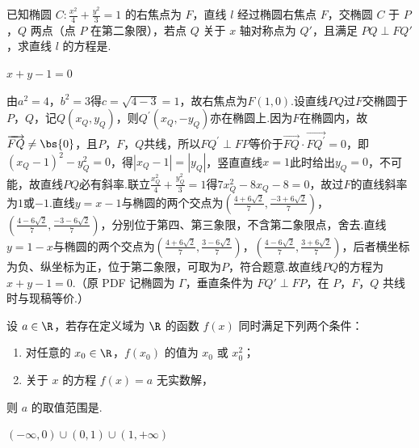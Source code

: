\begin{problem}
已知椭圆 \(C:\frac{x^2}{4}+\frac{y^2}{3}=1\) 的右焦点为 \(F\)，直线 \(l\) 经过椭圆右焦点 \(F\)，交椭圆 \(C\) 于 \(P\)，\(Q\) 两点（点 \(P\) 在第二象限），若点 \(Q\) 关于 \(x\) 轴对称点为 \(Q'\)，且满足 \(PQ\perp FQ'\)，求直线 \(l\) 的方程是\fillinblank{}.

\end{problem}

\begin{answer}
\(x+y-1=0\)
\end{answer}

\begin{solution}
由\(a^2=4\)，\(b^2=3\)得\(c=\sqrt{4-3}=1\)，故右焦点为\(F(1,0)\).设直线\(PQ\)过\(F\)交椭圆于\(P\)，\(Q\)，记\(Q(x_Q,y_Q)\)，则\(Q^\prime(x_Q,-y_Q)\)亦在椭圆上.因为\(F\)在椭圆内，故\(\overrightarrow{FQ}\ne\bs{0}\)，且\(P\)，\(F\)，\(Q\)共线，所以\(FQ^\prime\perp FP\)等价于\(\overrightarrow{FQ}\cdot\overrightarrow{FQ^\prime}=0\)，即\((x_Q-1)^2-y_Q^2=0\)，得\(|x_Q-1|=|y_Q|\)，竖直直线\(x=1\)此时给出\(y_Q=0\)，不可能，故直线\(PQ\)必有斜率.联立\(\frac{x_Q^2}{4}+\frac{y_Q^2}{3}=1\)得\(7x_Q^2-8x_Q-8=0\)，故过\(F\)的直线斜率为\(1\)或\(-1\).直线\(y=x-1\)与椭圆的两个交点为\(\left(\frac{4+6\sqrt2}{7},\frac{-3+6\sqrt2}{7}\right)\)，\(\left(\frac{4-6\sqrt2}{7},\frac{-3-6\sqrt2}{7}\right)\)，分别位于第四、第三象限，不含第二象限点，舍去.直线\(y=1-x\)与椭圆的两个交点为\(\left(\frac{4+6\sqrt2}{7},\frac{3-6\sqrt2}{7}\right)\)，\(\left(\frac{4-6\sqrt2}{7},\frac{3+6\sqrt2}{7}\right)\)，后者横坐标为负、纵坐标为正，位于第二象限，可取为\(P\)，符合题意.故直线\(PQ\)的方程为\(x+y-1=0\).（原 PDF 记椭圆为 \(\Gamma\)，垂直条件为 \(FQ'\perp FP\)，在 \(P\)，\(F\)，\(Q\) 共线时与现稿等价.）
\end{solution}

\begin{problem}
设 \(a\in\R\)，若存在定义域为 \(\R\) 的函数 \(f(x)\) 同时满足下列两个条件：

\begin{enumerate}
\item 对任意的 \(x_0\in\R\)，\(f(x_0)\) 的值为 \(x_0\) 或 \(x_0^2\)；
\item 关于 \(x\) 的方程 \(f(x)=a\) 无实数解，
\end{enumerate}

则 \(a\) 的取值范围是\fillinblank{}.
\end{problem}

\begin{answer}
\((-\infty,0)\cup(0,1)\cup(1,+\infty)\)
\end{answer}

